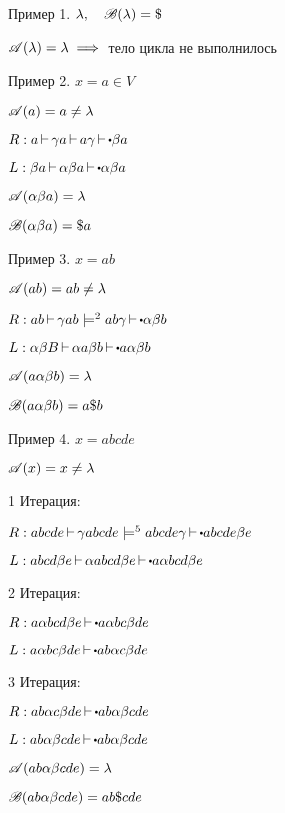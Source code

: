 \begin{itemize}
            Пример 1. $\lambda,\quad \scr{B}(\lambda) = \$$

            $\mathscr{A}(\lambda) = \lambda \implies $ тело цикла не выполнилось
            
            \medskip

            Пример 2. $x = a \in V$

            $\mathscr{A}(a) = a \neq \lambda$ 

            $R: a \step \gamma a\step a\gamma \step\bigcdot \beta a$

            $L: \beta a \step \alpha\beta a \step\bigcdot \alpha\beta a$

            $\mathscr{A}(\alpha\beta a) = \lambda$ 

            $\mathscr{B}(\alpha\beta a) = \$ a$
            
            \medskip

            Пример 3. $x = ab$

             $\mathscr{A}(ab) = ab \neq \lambda$ 

             $R: ab \step \gamma ab \models^{2} ab\gamma \step\bigcdot \alpha\beta b$ 

             $L: \alpha\beta B \step \alpha a\beta b \step\bigcdot a\alpha\beta b$

              $\mathscr{A}(a\alpha\beta b) = \lambda$ 

              $\mathscr{B}(a\alpha\beta b) = a\$b$

              \medskip

              Пример 4. $x = abcde$

               $\mathscr{A}(x) = x \neq \lambda$ 
                
               1 Итерация:

               $R: abcde \step \gamma abcde \models^{5} abcde\gamma \step\bigcdot abcde\beta e$

               $L: abcd\beta e \step \alpha abcd\beta e \step\bigcdot a\alpha bcd \beta e$

               2 Итерация:

               $R: a\alpha bcd\beta e \step\bigcdot a\alpha bc\beta de$

               $L: a\alpha bc\beta de \step\bigcdot ab\alpha c\beta de$

               3 Итерация:

               $R: ab\alpha c\beta de \step\bigcdot ab\alpha\beta cde$

               $L: ab\alpha\beta cde \step\bigcdot ab\alpha\beta cde$

               $\mathscr{A}(ab\alpha\beta cde) = \lambda$ 

               $\mathscr{B}(ab\alpha\beta cde) = ab\$cde$
\end{itemize}

